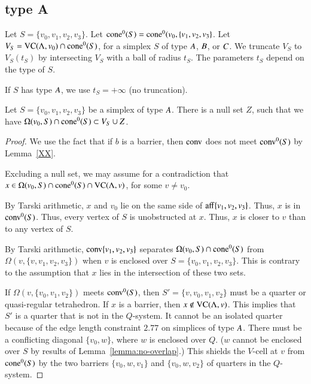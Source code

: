 \subsection{type A}%
    \label{sec:separation}

Let $S = \{v_0,v_1,v_2,v_3\}$.
Let ${\operatorname{cone}}^0(S) = {\operatorname{cone}}^0(v_0,\{v_1,v_2,v_3\}$.
Let $V_S = {\operatorname{VC}}(\Lambda,v_0)\cap {\operatorname{cone}}^0(S)$, for a simplex $S$ of type $A$,
$B$, or $C$. 
We truncate $V_S$ to $V_S(t_S)$ by intersecting
$V_S$ with a ball of radius $t_S$.  The parameters $t_S$ depend on
the type of $S$.

If $S$ has type $A$, we use $t_S=+\infty$ (no truncation).

\begin{lemma}
Let $S=\{v_0,v_1,v_2,v_3\}$ be a simplex of type $A$.
There is a null set $Z$, such that
we have  $ \Omega(v_0,S) \cap {\operatorname{cone}}^0(S) \subset V_S \cup Z$.
\end{lemma}

\begin{proof} 
We use the fact that if $b$ is a barrier, then ${\operatorname{conv}}$ does
not meet ${\operatorname{conv}}^0(S)$ by Lemma~\ref{XX}.  


Excluding a null set, we may assume 
for a contradiction that
$x\in \Omega(v_0,S) \cap {\operatorname{cone}}^0(S) \cap {\operatorname{VC}}(\Lambda,v)$,
for some $v\ne v_0$.  

By Tarski arithmetic, $x$ and $v_0$ lie on the
same side of ${\operatorname{aff}}\{v_1,v_2,v_3\}$.  Thus, $x$ is in
${\operatorname{conv}}^0(S)$.  
Thus, every vertex of $S$ is unobstructed at $x$.  Thus, $x$
is closer to $v$ than to any vertex of $S$.

By Tarski arithmetic, ${\operatorname{conv}}\{v_1,v_2,v_3\}$ 
separates
$\Omega(v_0,S)\cap {\operatorname{cone}}^0(S)$ from $\Omega(v,\{v,v_1,v_2,v_3\})$ when
$v$ is enclosed over $S=\{v_0,v_1,v_2,v_3\}$.  This is contrary
to the assumption that $x$ lies in the intersection of these
two sets.

If $\Omega(v,\{v_0,v_1,v_2\})$ meets ${\operatorname{conv}}^0(S)$, then
$S'=\{v,v_0,v_1,v_2\}$ must be a quarter or quasi-regular tetrahedron.
If $x$ is a barrier, then $x\not\in{\operatorname{VC}}(\Lambda,v)$.  This implies
that $S'$ is a quarter that is not in the $Q$-system.
It
cannot be an isolated quarter because of the edge length
constraint $2.77$ on simplices of type $A$.
There must be a
conflicting diagonal $\{v_0,w\}$, where $w$ is enclosed over $Q$. ($w$
cannot be enclosed over $S$ by results of
Lemma~\ref{lemma:no-overlap}.) This shields the $V$-cell at $v$
from ${\operatorname{cone}}^0(S)$ by the two barriers $\{v_0,w,v_1\}$ and $\{v_0,w,v_2\}$ of
quarters in the $Q$-system.
\end{proof}

